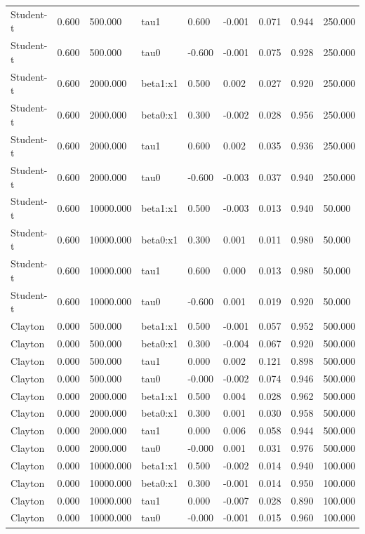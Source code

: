 \begin{table}[htbp]
\begin{tabular}{lllllllll}
Student-t & 0.600 & 500.000 & tau1 & 0.600 & -0.001 & 0.071 & 0.944 & 250.000 \\
Student-t & 0.600 & 500.000 & tau0 & -0.600 & -0.001 & 0.075 & 0.928 & 250.000 \\
Student-t & 0.600 & 2000.000 & beta1:x1 & 0.500 & 0.002 & 0.027 & 0.920 & 250.000 \\
Student-t & 0.600 & 2000.000 & beta0:x1 & 0.300 & -0.002 & 0.028 & 0.956 & 250.000 \\
Student-t & 0.600 & 2000.000 & tau1 & 0.600 & 0.002 & 0.035 & 0.936 & 250.000 \\
Student-t & 0.600 & 2000.000 & tau0 & -0.600 & -0.003 & 0.037 & 0.940 & 250.000 \\
Student-t & 0.600 & 10000.000 & beta1:x1 & 0.500 & -0.003 & 0.013 & 0.940 & 50.000 \\
Student-t & 0.600 & 10000.000 & beta0:x1 & 0.300 & 0.001 & 0.011 & 0.980 & 50.000 \\
Student-t & 0.600 & 10000.000 & tau1 & 0.600 & 0.000 & 0.013 & 0.980 & 50.000 \\
Student-t & 0.600 & 10000.000 & tau0 & -0.600 & 0.001 & 0.019 & 0.920 & 50.000 \\
Clayton & 0.000 & 500.000 & beta1:x1 & 0.500 & -0.001 & 0.057 & 0.952 & 500.000 \\
Clayton & 0.000 & 500.000 & beta0:x1 & 0.300 & -0.004 & 0.067 & 0.920 & 500.000 \\
Clayton & 0.000 & 500.000 & tau1 & 0.000 & 0.002 & 0.121 & 0.898 & 500.000 \\
Clayton & 0.000 & 500.000 & tau0 & -0.000 & -0.002 & 0.074 & 0.946 & 500.000 \\
Clayton & 0.000 & 2000.000 & beta1:x1 & 0.500 & 0.004 & 0.028 & 0.962 & 500.000 \\
Clayton & 0.000 & 2000.000 & beta0:x1 & 0.300 & 0.001 & 0.030 & 0.958 & 500.000 \\
Clayton & 0.000 & 2000.000 & tau1 & 0.000 & 0.006 & 0.058 & 0.944 & 500.000 \\
Clayton & 0.000 & 2000.000 & tau0 & -0.000 & 0.001 & 0.031 & 0.976 & 500.000 \\
Clayton & 0.000 & 10000.000 & beta1:x1 & 0.500 & -0.002 & 0.014 & 0.940 & 100.000 \\
Clayton & 0.000 & 10000.000 & beta0:x1 & 0.300 & -0.001 & 0.014 & 0.950 & 100.000 \\
Clayton & 0.000 & 10000.000 & tau1 & 0.000 & -0.007 & 0.028 & 0.890 & 100.000 \\
Clayton & 0.000 & 10000.000 & tau0 & -0.000 & -0.001 & 0.015 & 0.960 & 100.000 \\

\end{tabular}
\end{table}
